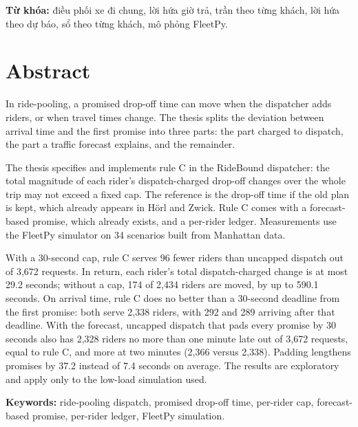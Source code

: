 \vspace{6pt}
\noindent\textbf{Từ khóa:} điều phối xe đi chung, lời hứa giờ trả, trần theo từng khách, lời hứa theo dự báo,
sổ theo từng khách, mô phỏng FleetPy.

\clearpage

\chapter*{Abstract}

In ride-pooling, a promised drop-off time can move when the dispatcher adds riders, or when travel times change.
The thesis splits the deviation between arrival time and the first promise into three parts: the part charged to
dispatch, the part a traffic forecast explains, and the remainder.

The thesis specifies and implements rule C in the RideBound dispatcher: the total magnitude of each rider's
dispatch-charged drop-off changes over the whole trip may not exceed a fixed cap. The reference is the drop-off time
if the old plan is kept, which already appears in Hörl and Zwick. Rule C comes with a forecast-based promise, which
already exists, and a per-rider ledger. Measurements use the FleetPy simulator on 34 scenarios built from Manhattan
data.

With a 30-second cap, rule C serves 96 fewer riders than uncapped dispatch out of 3,672 requests. In return, each
rider's total dispatch-charged change is at most 29.2 seconds; without a cap, 174 of 2,434 riders are moved, by up to
590.1 seconds. On arrival time, rule C does no better than a 30-second deadline from the first promise: both serve
2,338 riders, with 292 and 289 arriving after that deadline. With the forecast, uncapped
dispatch that pads every promise by 30 seconds also has 2,328 riders no more than one minute late out of 3,672
requests, equal to rule C, and more at two minutes (2,366 versus 2,338). Padding lengthens promises by 37.2 instead of
7.4 seconds on average. The results are exploratory and apply only to the low-load simulation used.

\vspace{6pt}
\noindent\textbf{Keywords:} ride-pooling dispatch, promised drop-off time, per-rider cap, forecast-based promise,
per-rider ledger, FleetPy simulation.

\clearpage
